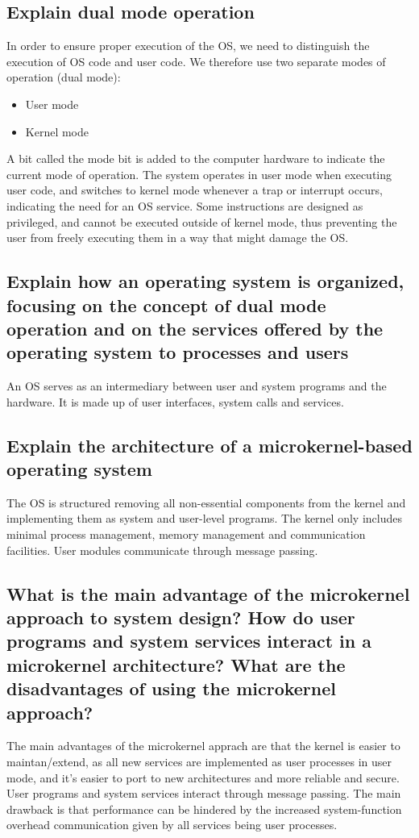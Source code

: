 \documentclass{article}
\begin{document}
\subsection{Explain dual mode operation}
In order to ensure proper execution of the OS, we need to distinguish the execution of OS code and user code. We therefore use two separate modes of operation (dual mode):
\begin{itemize}
    \item User mode
    \item Kernel mode
\end{itemize}
A bit called the mode bit is added to the computer hardware to indicate the current mode of operation. The system operates in user mode when executing user code, and switches to kernel mode whenever a trap or interrupt occurs, indicating the need for an OS service. Some instructions are designed as privileged, and cannot be executed outside of kernel mode, thus preventing the user from freely executing them in a way that might damage the OS.


\subsection{Explain how an operating system is organized, focusing on the concept of dual mode operation and on the services offered by the operating system to processes and users}
An OS serves as an intermediary between user and system programs and the hardware. It is made up of user interfaces, system calls and services. 

\subsection{Explain the architecture of a microkernel-based operating system}
The OS is structured removing all non-essential components from the kernel and implementing them as system and user-level programs. The kernel only includes minimal process management, memory management and communication facilities. User modules communicate through message passing.


\subsection{What is the main advantage of the microkernel approach to system design? How do user programs and system services interact in a microkernel architecture? What are the disadvantages of using the microkernel approach?}
The main advantages of the microkernel apprach are that the kernel is easier to maintan/extend, as all new services are implemented as user processes in user mode, and it's easier to port to new architectures and more reliable and secure. User programs and system services interact through message passing. The main drawback is that performance can be hindered by the increased system-function overhead communication given by all services being user processes.
\end{document}
